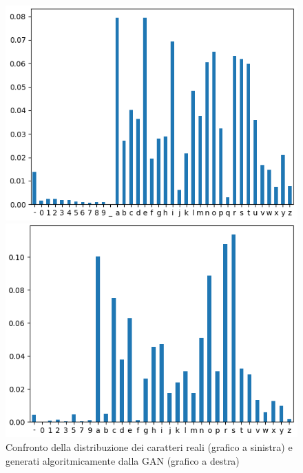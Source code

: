 \begin{figure}[!bp]
    \centering
    \begin{minipage}[t]{0.45\columnwidth}
		\includegraphics[width=\linewidth]{figures/all_legit_char_distr.png}
	\end{minipage}
	\begin{minipage}[b]{0.45\columnwidth}
		\includegraphics[width=\linewidth]{figures/chars_histogram.png}
	\end{minipage}
\caption{Confronto della distribuzione dei caratteri reali (grafico a sinistra) e generati algoritmicamente dalla GAN (grafico a destra) \label{fig:chardistr}}
\end{figure}

